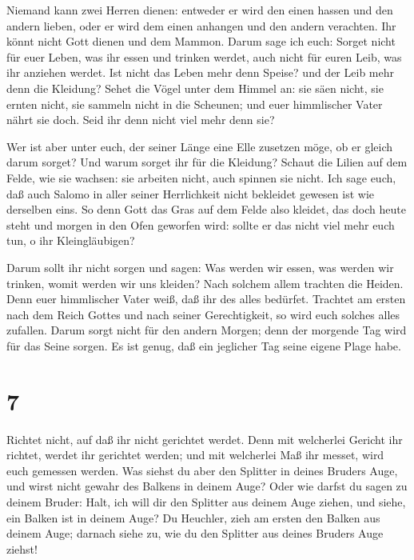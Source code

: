  Niemand kann zwei Herren dienen: entweder er wird den
einen hassen und den andern lieben, oder er wird dem einen anhangen und
den andern verachten. Ihr könnt nicht Gott dienen und dem Mammon.
 Darum sage ich euch: Sorget nicht für euer Leben, was ihr
essen und trinken werdet, auch nicht für euren Leib, was ihr anziehen
werdet. Ist nicht das Leben mehr denn Speise? und der Leib mehr denn die
Kleidung?  Sehet die Vögel unter dem Himmel an: sie säen
nicht, sie ernten nicht, sie sammeln nicht in die Scheunen; und euer
himmlischer Vater nährt sie doch. Seid ihr denn nicht viel mehr denn
sie?

 Wer ist aber unter euch, der seiner Länge eine Elle
zusetzen möge, ob er gleich darum sorget?  Und warum sorget
ihr für die Kleidung? Schaut die Lilien auf dem Felde, wie sie wachsen:
sie arbeiten nicht, auch spinnen sie nicht.  Ich sage euch,
daß auch Salomo in aller seiner Herrlichkeit nicht bekleidet gewesen ist
wie derselben eins.  So denn Gott das Gras auf dem Felde
also kleidet, das doch heute steht und morgen in den Ofen geworfen wird:
sollte er das nicht viel mehr euch tun, o ihr Kleingläubigen?

 Darum sollt ihr nicht sorgen und sagen: Was werden wir
essen, was werden wir trinken, womit werden wir uns kleiden?
 Nach solchem allem trachten die Heiden. Denn euer
himmlischer Vater weiß, daß ihr des alles bedürfet. 
Trachtet am ersten nach dem Reich Gottes und nach seiner Gerechtigkeit,
so wird euch solches alles zufallen.  Darum sorgt nicht für
den andern Morgen; denn der morgende Tag wird für das Seine sorgen. Es
ist genug, daß ein jeglicher Tag seine eigene Plage habe.

\hypertarget{section-6}{%
\section{7}\label{section-6}}

 Richtet nicht, auf daß ihr nicht gerichtet werdet.
 Denn mit welcherlei Gericht ihr richtet, werdet ihr
gerichtet werden; und mit welcherlei Maß ihr messet, wird euch gemessen
werden.  Was siehst du aber den Splitter in deines Bruders
Auge, und wirst nicht gewahr des Balkens in deinem Auge? 
Oder wie darfst du sagen zu deinem Bruder: Halt, ich will dir den
Splitter aus deinem Auge ziehen, und siehe, ein Balken ist in deinem
Auge?  Du Heuchler, zieh am ersten den Balken aus deinem
Auge; darnach siehe zu, wie du den Splitter aus deines Bruders Auge
ziehst!

